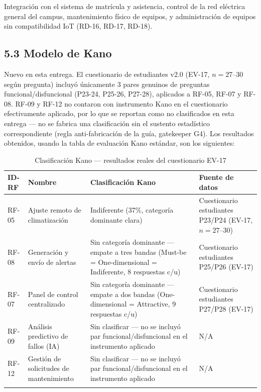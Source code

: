 Integración con el sistema de matrícula y asistencia, control de la red eléctrica general del campus, mantenimiento físico de equipos, y administración de equipos sin compatibilidad IoT (RD-16, RD-17, RD-18).


\subsection*{5.3 Modelo de Kano}


Nuevo en esta entrega. El cuestionario de estudiantes v2.0 (EV-17, $n=27$--$30$ según pregunta) incluyó únicamente 3 pares genuinos de preguntas funcional/disfuncional (P23-24, P25-26, P27-28), aplicados a RF-05, RF-07 y RF-08. RF-09 y RF-12 no contaron con instrumento Kano en el cuestionario efectivamente aplicado, por lo que se reportan como no clasificados en esta entrega --- no se fabrica una clasificación sin el sustento estadístico correspondiente (regla anti-fabricación de la guía, gatekeeper G4). Los resultados obtenidos, usando la tabla de evaluación Kano estándar, son los siguientes:


\begingroup
\small
\begin{longtable}{|P{0.2500}|P{0.2500}|P{0.2500}|P{0.2500}|}
\hline
ID-RF & Nombre & Clasificación Kano & Fuente de datos \\ \hline
RF-05 & Ajuste remoto de climatización & Indiferente (37\%, categoría dominante clara) & Cuestionario estudiantes P23/P24 (EV-17, $n=27$--$30$) \\ \hline
RF-08 & Generación y envío de alertas & Sin categoría dominante --- empate a tres bandas (Must-be = One-dimensional = Indiferente, 8 respuestas c/u) & Cuestionario estudiantes P25/P26 (EV-17) \\ \hline
RF-07 & Panel de control centralizado & Sin categoría dominante --- empate a dos bandas (One-dimensional = Attractive, 9 respuestas c/u) & Cuestionario estudiantes P27/P28 (EV-17) \\ \hline
RF-09 & Análisis predictivo de fallos (IA) & Sin clasificar --- no se incluyó par funcional/disfuncional en el instrumento aplicado & N/A \\ \hline
RF-12 & Gestión de solicitudes de mantenimiento & Sin clasificar --- no se incluyó par funcional/disfuncional en el instrumento aplicado & N/A \\ \hline
\caption{Clasificación Kano --- resultados reales del cuestionario EV-17}
\end{longtable}
\endgroup


